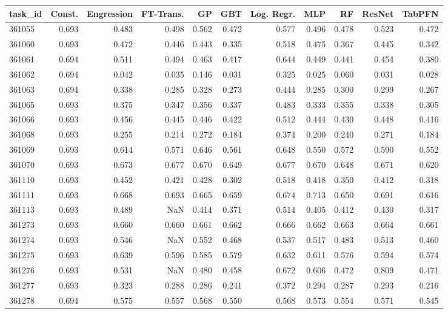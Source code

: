 \begin{tabular}{lrrrrrrrrrr}
\toprule
task\_id & Const. & Engression & FT-Trans. & GP & GBT & Log. Regr. & MLP & RF & ResNet & TabPFN \\
\midrule
361055 & 0.693 & 0.483 & 0.498 & 0.562 & 0.472 & 0.577 & 0.496 & 0.478 & 0.523 & 0.472 \\
361060 & 0.693 & 0.472 & 0.446 & 0.443 & 0.335 & 0.518 & 0.475 & 0.367 & 0.445 & 0.342 \\
361061 & 0.694 & 0.511 & 0.494 & 0.463 & 0.417 & 0.644 & 0.449 & 0.441 & 0.454 & 0.380 \\
361062 & 0.694 & 0.042 & 0.035 & 0.146 & 0.031 & 0.325 & 0.025 & 0.060 & 0.031 & 0.028 \\
361063 & 0.694 & 0.338 & 0.285 & 0.328 & 0.273 & 0.444 & 0.285 & 0.300 & 0.299 & 0.267 \\
361065 & 0.693 & 0.375 & 0.347 & 0.356 & 0.337 & 0.483 & 0.333 & 0.355 & 0.338 & 0.305 \\
361066 & 0.693 & 0.456 & 0.445 & 0.446 & 0.422 & 0.512 & 0.444 & 0.430 & 0.448 & 0.416 \\
361068 & 0.693 & 0.255 & 0.214 & 0.272 & 0.184 & 0.374 & 0.200 & 0.240 & 0.271 & 0.184 \\
361069 & 0.693 & 0.614 & 0.571 & 0.646 & 0.561 & 0.648 & 0.550 & 0.572 & 0.590 & 0.552 \\
361070 & 0.693 & 0.673 & 0.677 & 0.670 & 0.649 & 0.677 & 0.670 & 0.648 & 0.671 & 0.620 \\
361110 & 0.693 & 0.452 & 0.421 & 0.428 & 0.302 & 0.518 & 0.418 & 0.350 & 0.412 & 0.318 \\
361111 & 0.693 & 0.668 & 0.693 & 0.665 & 0.659 & 0.674 & 0.713 & 0.650 & 0.691 & 0.616 \\
361113 & 0.693 & 0.489 & NaN & 0.414 & 0.371 & 0.514 & 0.405 & 0.412 & 0.430 & 0.317 \\
361273 & 0.693 & 0.660 & 0.660 & 0.661 & 0.662 & 0.666 & 0.662 & 0.663 & 0.664 & 0.661 \\
361274 & 0.693 & 0.546 & NaN & 0.552 & 0.468 & 0.537 & 0.517 & 0.483 & 0.513 & 0.460 \\
361275 & 0.693 & 0.639 & 0.596 & 0.585 & 0.579 & 0.632 & 0.611 & 0.576 & 0.594 & 0.574 \\
361276 & 0.693 & 0.531 & NaN & 0.480 & 0.458 & 0.672 & 0.606 & 0.472 & 0.809 & 0.471 \\
361277 & 0.693 & 0.323 & 0.288 & 0.286 & 0.241 & 0.372 & 0.294 & 0.287 & 0.293 & 0.216 \\
361278 & 0.694 & 0.575 & 0.557 & 0.568 & 0.550 & 0.568 & 0.573 & 0.554 & 0.571 & 0.545 \\

\end{tabular}
